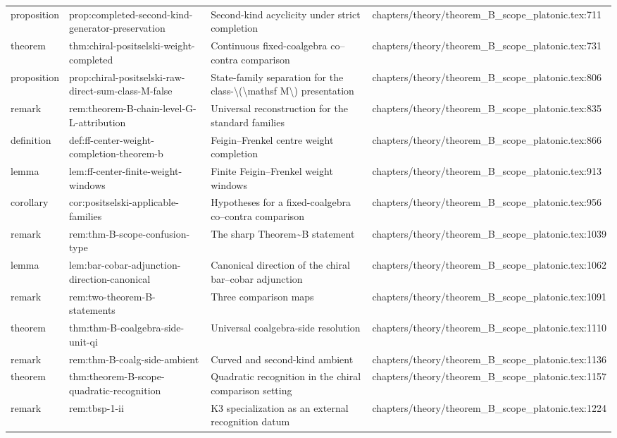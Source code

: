 \documentclass[11pt]{article}
\begin{document}
\begin{longtable}{L{0.10\textwidth}L{0.26\textwidth}L{0.42\textwidth}L{0.22\textwidth}}
proposition & prop:completed-second-kind-generator-preservation & Second-kind acyclicity under strict completion & chapters/theory/theorem\_B\_scope\_platonic.tex:711\\
theorem & thm:chiral-positselski-weight-completed & Continuous fixed-coalgebra co--contra comparison & chapters/theory/theorem\_B\_scope\_platonic.tex:731\\
proposition & prop:chiral-positselski-raw-direct-sum-class-M-false & State-family separation for the class-\textbackslash{}(\textbackslash{}mathsf M\textbackslash{}) presentation & chapters/theory/theorem\_B\_scope\_platonic.tex:806\\
remark & rem:theorem-B-chain-level-G-L-attribution & Universal reconstruction for the standard families & chapters/theory/theorem\_B\_scope\_platonic.tex:835\\
definition & def:ff-center-weight-completion-theorem-b & Feigin--Frenkel centre weight completion & chapters/theory/theorem\_B\_scope\_platonic.tex:866\\
lemma & lem:ff-center-finite-weight-windows & Finite Feigin--Frenkel weight windows & chapters/theory/theorem\_B\_scope\_platonic.tex:913\\
corollary & cor:positselski-applicable-families & Hypotheses for a fixed-coalgebra co--contra comparison & chapters/theory/theorem\_B\_scope\_platonic.tex:956\\
remark & rem:thm-B-scope-confusion-type & The sharp Theorem\textasciitilde{}B statement & chapters/theory/theorem\_B\_scope\_platonic.tex:1039\\
lemma & lem:bar-cobar-adjunction-direction-canonical & Canonical direction of the chiral bar--cobar adjunction & chapters/theory/theorem\_B\_scope\_platonic.tex:1062\\
remark & rem:two-theorem-B-statements & Three comparison maps & chapters/theory/theorem\_B\_scope\_platonic.tex:1091\\
theorem & thm:thm-B-coalgebra-side-unit-qi & Universal coalgebra-side resolution & chapters/theory/theorem\_B\_scope\_platonic.tex:1110\\
remark & rem:thm-B-coalg-side-ambient & Curved and second-kind ambient & chapters/theory/theorem\_B\_scope\_platonic.tex:1136\\
theorem & thm:theorem-B-scope-quadratic-recognition & Quadratic recognition in the chiral comparison setting & chapters/theory/theorem\_B\_scope\_platonic.tex:1157\\
remark & rem:tbsp-1-ii & K3 specialization as an external recognition datum & chapters/theory/theorem\_B\_scope\_platonic.tex:1224\\

\end{longtable}
\end{document}
